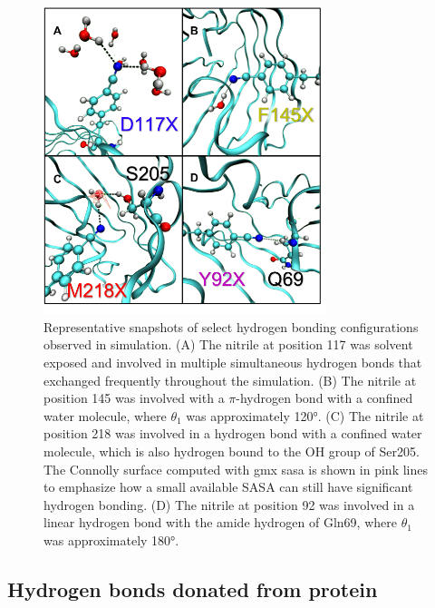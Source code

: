 \begin{figure}
    \center
    \includegraphics[width=3.25in]{figures-gfp-hbond/snapshots.png}
    \caption{Representative snapshots of select hydrogen bonding configurations observed in simulation. (A) The nitrile at position 117 was solvent exposed and involved in multiple simultaneous hydrogen bonds that exchanged frequently throughout the simulation. (B) The nitrile at position 145 was involved with a $\pi$-hydrogen bond with a confined water molecule, where $\theta_1$ was approximately \ang{120}. (C) The nitrile at position 218 was involved in a hydrogen bond with a confined water molecule, which is also hydrogen bound to the OH group of Ser205. The Connolly surface computed with gmx sasa is shown in pink lines to emphasize how a small available SASA can still have significant hydrogen bonding. (D) The nitrile at position 92 was involved in a linear hydrogen bond with the amide hydrogen of Gln69, where $\theta_1$ was approximately \ang{180}.}
    \label{fig:hbond-snapshot}
\end{figure}

\subsection{Hydrogen bonds donated from protein}

